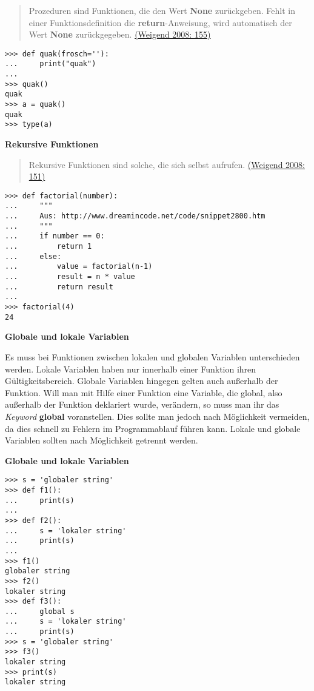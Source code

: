 \begin{quote}
Prozeduren sind Funktionen, die den Wert \textbf{None} zurückgeben.
Fehlt in einer Funktionsdefinition die \textbf{return}-Anweisung, wird
automatisch der Wert \textbf{None} zurückgegeben.
\href{http://bibliography.lingpy.org?key=Weigend2008}{(Weigend 2008:
155)}
\end{quote}

\begin{verbatim}
>>> def quak(frosch=''):
...     print("quak")
...
>>> quak()
quak
>>> a = quak()
quak
>>> type(a)
\end{verbatim}



\par\noindent\textbf{Rekursive Funktionen}

\begin{quote}
Rekursive Funktionen sind solche, die sich selbst aufrufen.
\href{http://bibliography.lingpy.org?key=Weigend2008}{(Weigend 2008:
151)}
\end{quote}

\begin{verbatim}
>>> def factorial(number):
...     """
...     Aus: http://www.dreamincode.net/code/snippet2800.htm
...     """
...     if number == 0:
...         return 1
...     else:
...         value = factorial(n-1)
...         result = n * value
...         return result
...
>>> factorial(4)
24
\end{verbatim}



\par\noindent\textbf{Globale und lokale Variablen}

Es muss bei Funktionen zwischen lokalen und globalen Variablen
unterschieden werden. Lokale Variablen haben nur innerhalb einer
Funktion ihren Gültigkeitsbereich. Globale Variablen hingegen gelten
auch außerhalb der Funktion. Will man mit Hilfe einer Funktion eine
Variable, die global, also außerhalb der Funktion deklariert wurde,
verändern, so muss man ihr das \emph{Keyword} \textbf{global}
voranstellen. Dies sollte man jedoch nach Möglichkeit vermeiden, da dies
schnell zu Fehlern im Programmablauf führen kann. Lokale und globale
Variablen sollten nach Möglichkeit getrennt werden.



\par\noindent\textbf{Globale und lokale Variablen}

\begin{verbatim}
>>> s = 'globaler string'
>>> def f1():
...     print(s)
...
>>> def f2():
...     s = 'lokaler string'
...     print(s)
...
>>> f1()
globaler string
>>> f2()
lokaler string
>>> def f3():
...     global s
...     s = 'lokaler string'
...     print(s)
>>> s = 'globaler string'
>>> f3()
lokaler string
>>> print(s)
lokaler string
\end{verbatim}

